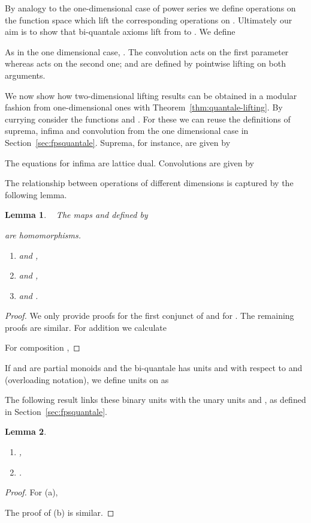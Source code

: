 \documentclass[12pt]{article}
\newtheorem{lemma}{Lemma}
\theoremstyle{definition}
\begin{document}
By analogy to the one-dimensional case of  power series we
define operations on the function space  which lift
the corresponding operations on . Ultimately our aim is to show
that bi-quantale axioms lift from  to . We
define

As in the one dimensional case, .  The
convolution  acts on the first parameter whereas  acts on the second one;  and  are defined by
pointwise lifting on both arguments. 

We now show how two-dimensional lifting results can be obtained in a
modular fashion from one-dimensional ones with
Theorem~\ref{thm:quantale-lifting}.  By currying consider the
functions  and . For these we can reuse the definitions of suprema, infima and
convolution from the one dimensional case in
Section~\ref{sec:fpsquantale}. Suprema, for instance, are given by

The equations for infima are lattice dual.  Convolutions are given by


The relationship between operations of different dimensions is
captured by the following lemma.
\begin{lemma}\label{P:spacered1}~
  The maps  and   defined by
  
  are homomorphisms.
\begin{enumerate}
\item  and ,
\item  and ,
\item  and  .
\end{enumerate}
\end{lemma}
\begin{proof}
  We only provide proofs for the first conjunct of  and for
  . The remaining proofs are similar.  For addition we calculate
  
  For composition ,
  
\end{proof}

If  and  are partial
monoids and the bi-quantale  has units  and  with respect
to  and  (overloading notation), we define units on
 as

The following result links these binary units with the unary units
 and , as
defined in Section~\ref{sec:fpsquantale}.
\begin{lemma}\label{P:spacered2}~ 
  \begin{enumerate}
  \item ,
  \item  .
  \end{enumerate}
\end{lemma}
\begin{proof}
  For (a),
  
 The proof of (b) is similar.
\end{proof}
\end{document}
